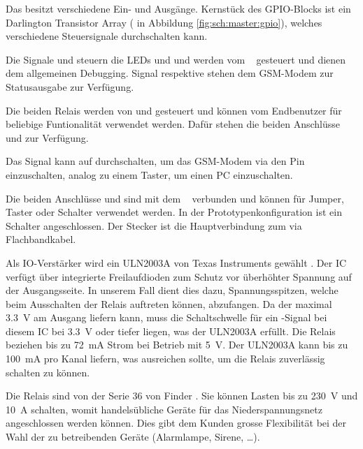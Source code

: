 Das  \Master   besitzt  verschiedene  Ein-  und   Ausg\"ange. Kernst\"uck  des
GPIO-Blocks  ist  ein Darlington  Transistor  Array  ( in  Abbildung
\ref{fig:sch:master:gpio}),  welches verschiedene  Steuersignale durchschalten
kann.

Die  Signale    und   steuern  die  LEDs    und
  und  werden  vom  \Raspi~  gesteuert  und  dienen  dem  allgemeinen
Debugging. Signal    respektive    stehen  dem
GSM-Modem zur Statusausgabe zur Verf\"ugung.

Die   beiden  Relais   werden  von     und     gesteuert
und  k\"onnen  vom  Endbenutzer   f\"ur  beliebige  Funtionalit\"at  verwendet
werden. Daf\"ur stehen  die beiden  Anschl\"usse  und   zur
Verf\"ugung.

Das Signal  kann auf  durchschalten, um das GSM-Modem
via den Pin   einzuschalten, analog zu einem  Taster, um einen
PC einzuschalten.

Die  beiden  Anschl\"usse    und   sind  mit  dem  \Raspi~
verbunden und k\"onnen f\"ur Jumper, Taster oder Schalter verwendet werden. In
der  Prototypenkonfiguration  ist   ein  Schalter  angeschlossen. Der  Stecker
 ist die Hauptverbindung zum \Raspi via Flachbandkabel.

Als  IO-Verst\"arker  wird  ein   ULN2003A  von  Texas  Instruments  gew\"ahlt
\cite{datasheet:darlingtonic}. Der    IC    verf\"ugt    \"uber    integrierte
Freilaufdioden   zum    Schutz   vor    \"uberh\"ohter   Spannung    auf   der
Ausgangsseite. In unserem Fall dient  dies dazu, Spannungsspitzen, welche beim
Ausschalten der Relais auftreten k\"onnen,  abzufangen.  Da der \Raspi maximal
\SI{3.3}{\volt} am  Ausgang liefern  kann, muss  die Schaltschwelle  f\"ur ein
-Signal bei diesem  IC bei \SI{3.3}{\volt} oder  tiefer liegen, was
der  ULN2003A erf\"ullt.   Die Relais  beziehen bis  zu \SI{72}{\milli\ampere}
\cite{datasheet:finder36relais}  Strom  bei   Betrieb  mit  \SI{5}{\volt}. Der
ULN2003A kann bis zu \SI{100}{\milli\ampere} pro Kanal liefern, was ausreichen
sollte, um die Relais zuverl\"assig schalten zu k\"onnen.

Die     Relais      sind     von      der     Serie     36      von     Finder
\cite{datasheet:finder36relais}. Sie  k\"onnen Lasten  bis zu  \SI{230}{\volt}
und  \SI{10}{\ampere}  schalten,  womit handels\"ubliche  Ger\"ate  f\"ur  das
Niederspannungsnetz angeschlossen werden k\"onnen. Dies gibt dem Kunden grosse
Flexibilit\"at bei der Wahl der  zu betreibenden Ger\"ate (Alarmlampe, Sirene,
\ldots).


